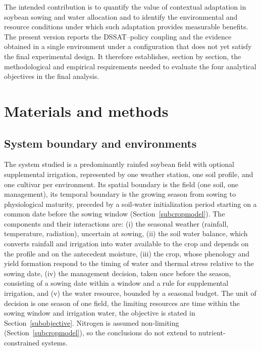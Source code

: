 \documentclass[times,final,authoryear]{elsarticle}
\begin{document}
The intended contribution is to quantify the value of contextual adaptation in soybean sowing and water allocation and to identify the environmental and resource conditions under which such adaptation provides measurable benefits. The present version reports the DSSAT--policy coupling and the evidence obtained in a single environment under a configuration that does not yet satisfy the final experimental design. It therefore establishes, section by section, the methodological and empirical requirements needed to evaluate the four analytical objectives in the final analysis.


\section{Materials and methods}
\label{metodologia}



\subsection{System boundary and environments}
\label{subsystem}

The system studied is a predominantly rainfed soybean field with optional supplemental irrigation, represented by one weather station, one soil profile, and one cultivar per environment. Its spatial boundary is the field (one soil, one management), its temporal boundary is the growing season from sowing to physiological maturity, preceded by a soil-water initialization period starting on a common date before the sowing window (Section~\ref{subcropmodel}). The components and their interactions are: (i) the seasonal weather (rainfall, temperature, radiation), uncertain at sowing, (ii) the soil water balance, which converts rainfall and irrigation into water available to the crop and depends on the profile and on the antecedent moisture, (iii) the crop, whose phenology and yield formation respond to the timing of water and thermal stress relative to the sowing date, (iv) the management decision, taken once before the season, consisting of a sowing date within a window and a rule for supplemental irrigation, and (v) the water resource, bounded by a seasonal budget. The unit of decision is one season of one field, the limiting resources are time within the sowing window and irrigation water, the objective is stated in Section~\ref{subobjective}. Nitrogen is assumed non-limiting (Section~\ref{subcropmodel}), so the conclusions do not extend to nutrient-constrained systems.
\end{document}
